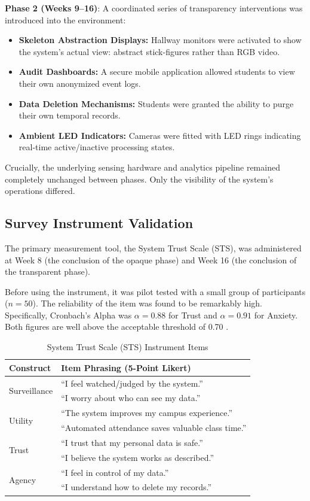 \documentclass[conference]{IEEEtran}
\begin{document}
\textbf{Phase 2 (Weeks 9--16)}: A coordinated series of transparency interventions was introduced into the environment:
\begin{itemize}
    \item \textbf{Skeleton Abstraction Displays:} Hallway monitors were activated to show the system's actual view: abstract stick-figures rather than RGB video.
    \item \textbf{Audit Dashboards:} A secure mobile application allowed students to view their own anonymized event logs.
    \item \textbf{Data Deletion Mechanisms:} Students were granted the ability to purge their own temporal records.
    \item \textbf{Ambient LED Indicators:} Cameras were fitted with LED rings indicating real-time active/inactive processing states.
\end{itemize}
Crucially, the underlying sensing hardware and analytics pipeline remained completely unchanged between phases. Only the visibility of the system's operations differed.

\subsection{Survey Instrument Validation}
The primary measurement tool, the System Trust Scale (STS), was administered at Week 8 (the conclusion of the opaque phase) and Week 16 (the conclusion of the transparent phase). 

Before using the instrument, it was pilot tested with a small group of participants ($n = 50$). The reliability of the item was found to be remarkably high. Specifically, Cronbach’s Alpha was $\alpha = 0.88$ for Trust and $\alpha = 0.91$ for Anxiety. Both figures are well above the acceptable threshold of 0.70 \cite{b25}.

\begin{table}[htbp]
\caption{System Trust Scale (STS) Instrument Items}
\begin{center}
\begin{tabular}{lp{6cm}}
\toprule
\textbf{Construct} & \textbf{Item Phrasing (5-Point Likert)} \\
\midrule
\multirow{2}{*}{Surveillance} & ``I feel watched/judged by the system.'' \\
& ``I worry about who can see my data.'' \\
\midrule
\multirow{2}{*}{Utility} & ``The system improves my campus experience.'' \\
& ``Automated attendance saves valuable class time.'' \\
\midrule
\multirow{2}{*}{Trust} & ``I trust that my personal data is safe.'' \\
& ``I believe the system works as described.'' \\
\midrule
\multirow{2}{*}{Agency} & ``I feel in control of my data.'' \\
& ``I understand how to delete my records.'' \\
\bottomrule
\end{tabular}
\end{center}
\label{tab:survey}
\end{table}
\end{document}
